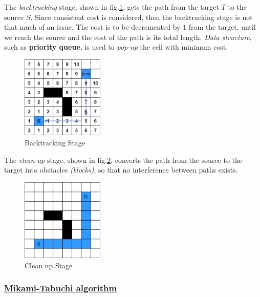     The \emph{backtracking} stage, shown in fig.\ref{fig:backtrackingStage}, gets the path from the target $T$ to the source $S$.
    Since consistent cost is considered, then the backtracking stage is not that much of an issue.
    The cost is to be decremented by $1$ from the target, until we reach the source and the cost of the path is its total length.
    \emph{Data structure}, such as \textbf{priority queue}, is used to \emph{pop-up}
    the cell with minimum cost.

    \begin{figure}
        \centering
        \includegraphics[width=0.35\textwidth]{figures/Lee Stages/back-track.png}
        \caption{Backtracking Stage}
        \label{fig:backtrackingStage}
    \end{figure}

    The \emph{clean up} stage, shown in fig.\ref{fig:cleanUpStage}, converts the path from the source to the target into obstacles \emph{(blocks)}, so that no interference between paths exists.

    \begin{figure}
        \centering
        \includegraphics[width=0.35\textwidth]{figures/Lee Stages/clean_up.png}
        \caption{Clean up Stage}
        \label{fig:cleanUpStage}
    \end{figure}

    \subsubsection{\underline{Mikami-Tabuchi algorithm}}
    \label{MikamiSection}
    

